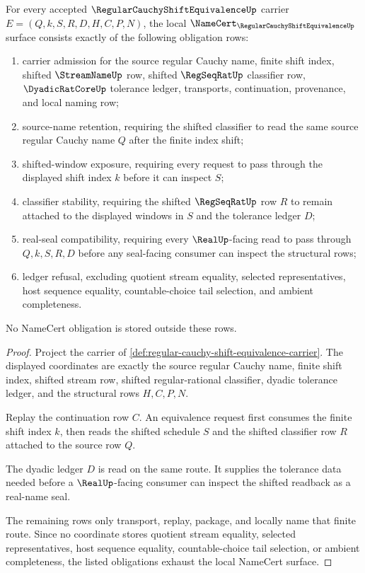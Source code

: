 \begin{theorem}
\label{thm:regular-cauchy-shift-equivalence-namecert-obligations}
For every accepted $\RegularCauchyShiftEquivalenceUp$ carrier $E=(Q,k,S,R,D,H,C,P,N)$, the local $\NameCert_{\RegularCauchyShiftEquivalenceUp}$ surface consists exactly of the following obligation rows:
\begin{enumerate}
\item carrier admission for the source regular Cauchy name, finite shift index, shifted $\StreamNameUp$ row, shifted $\RegSeqRatUp$ classifier row, $\DyadicRatCoreUp$ tolerance ledger, transports, continuation, provenance, and local naming row;
\item source-name retention, requiring the shifted classifier to read the same source regular Cauchy name $Q$ after the finite index shift;
\item shifted-window exposure, requiring every request to pass through the displayed shift index $k$ before it can inspect $S$;
\item classifier stability, requiring the shifted $\RegSeqRatUp$ row $R$ to remain attached to the displayed windows in $S$ and the tolerance ledger $D$;
\item real-seal compatibility, requiring every $\RealUp$-facing read to pass through $Q,k,S,R,D$ before any seal-facing consumer can inspect the structural rows;
\item ledger refusal, excluding quotient stream equality, selected representatives, host sequence equality, countable-choice tail selection, and ambient completeness.
\end{enumerate}
No NameCert obligation is stored outside these rows.
\end{theorem}
\begin{proof}
Project the carrier of \autoref{def:regular-cauchy-shift-equivalence-carrier}. The displayed coordinates are exactly the source regular Cauchy name, finite shift index, shifted stream row, shifted regular-rational classifier, dyadic tolerance ledger, and the structural rows $H,C,P,N$.

Replay the continuation row $C$. An equivalence request first consumes the finite shift index $k$, then reads the shifted schedule $S$ and the shifted classifier row $R$ attached to the source row $Q$.

The dyadic ledger $D$ is read on the same route. It supplies the tolerance data needed before a $\RealUp$-facing consumer can inspect the shifted readback as a real-name seal.

The remaining rows only transport, replay, package, and locally name that finite route. Since no coordinate stores quotient stream equality, selected representatives, host sequence equality, countable-choice tail selection, or ambient completeness, the listed obligations exhaust the local NameCert surface.
\end{proof}

